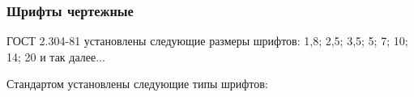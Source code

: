 \documentclass{article}
\begin{document}
\subsubsection{Шрифты чертежные}

ГОСТ 2.304-81 установлены следующие размеры шрифтов: 1,8; 2,5; 3,5; 5; 7; 10; 14; 20 и так далее...

Стандартом установлены следующие типы шрифтов:

\begin{multienumerate}
\end{multienumerate}
\end{document}
